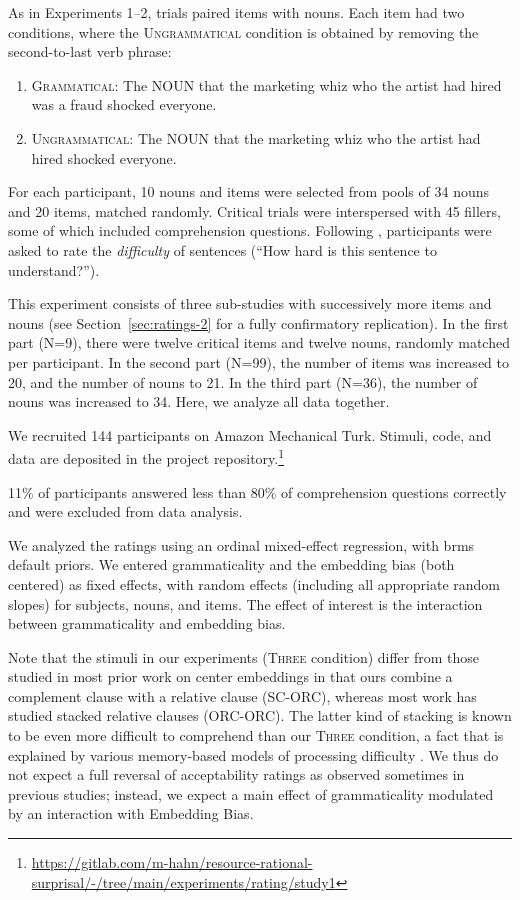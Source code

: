 As in Experiments 1--2, trials paired items with nouns.
Each item had two conditions, where the \textsc{Ungrammatical} condition is obtained by removing the second-to-last verb phrase:
\begin{enumerate}
\item \textsc{Grammatical}: The NOUN that the marketing whiz who the artist had hired was a fraud shocked everyone.
\item \textsc{Ungrammatical}: The NOUN that the marketing whiz who the artist had hired shocked everyone.
\end{enumerate}
For each participant, 10 nouns and items were selected from pools of 34 nouns and 20 items, matched randomly.
Critical trials were interspersed with 45 fillers, some of which included comprehension questions.
Following \citep{gibson1999memory}, participants were asked to rate the \emph{difficulty} of sentences (``How hard is this sentence to understand?'').



This experiment consists of three sub-studies with successively more items and nouns (see Section~\ref{sec:ratings-2} for a fully confirmatory replication).
In the first part (N=9), there were twelve critical items and twelve nouns, randomly matched per participant.
In the second part (N=99), the number of items was increased to  20, and the number of nouns to 21.
In the third part (N=36), the number of nouns was increased to 34.
Here, we analyze all data together.



We recruited 144 participants on Amazon Mechanical Turk.
Stimuli, code, and data are deposited in the project repository.\footnote{\url{https://gitlab.com/m-hahn/resource-rational-surprisal/-/tree/main/experiments/rating/study1}}

11\% of participants answered less than 80\% of comprehension questions correctly and were excluded from data analysis.





We analyzed the ratings using an ordinal mixed-effect regression, with brms default priors.
We entered grammaticality and the embedding bias (both centered) as fixed effects, with random effects (including all appropriate random slopes) for subjects, nouns, and items.
The effect of interest is the interaction between grammaticality and embedding bias.


Note that the stimuli in our experiments (\textsc{Three} condition) differ from those studied in most prior work on center embeddings in that ours combine a complement clause with a relative clause (SC-ORC), whereas most work has studied stacked relative clauses (ORC-ORC).
The latter kind of stacking is known to be even more difficult to comprehend than our \textsc{Three} condition, a fact that is explained by various memory-based models of processing difficulty \citep{Gibson2000TheDL, lewis2005activation}.
We thus do not expect a full reversal of acceptability ratings as observed sometimes in previous studies; instead, we expect a main effect of grammaticality modulated by an interaction with Embedding Bias.




